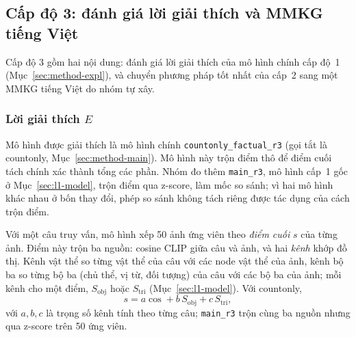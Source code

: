 \subsection{Cấp độ 3: đánh giá lời giải thích và MMKG tiếng Việt}
\label{sec:method-l3}

Cấp độ 3 gồm hai nội dung: đánh giá lời giải thích của mô hình chính cấp độ~1 (Mục~\ref{sec:method-expl}), và chuyển phương pháp
tốt nhất của cấp~2 sang một MMKG tiếng Việt do nhóm tự xây.

\subsubsection{Lời giải thích $E$}\label{sec:xai-setup}
Mô hình được giải thích là mô hình chính \texttt{countonly\_factual\_r3} (gọi tắt là countonly, Mục~\ref{sec:method-main}).
Mô hình này trộn điểm thô để điểm cuối tách chính xác thành tổng các phần. Nhóm đo thêm \texttt{main\_r3}, mô hình
cấp~1 gốc ở Mục~\ref{sec:l1-model}, trộn điểm qua z-score, làm mốc so sánh; vì hai mô hình khác nhau ở bốn thay đổi, phép
so sánh không tách riêng được tác dụng của cách trộn điểm.

Với một câu truy vấn, mô hình xếp 50 ảnh ứng viên theo \emph{điểm cuối} $s$ của từng ảnh. Điểm này trộn ba nguồn:
cosine CLIP giữa câu và ảnh, và hai \emph{kênh} khớp đồ thị. Kênh vật thể so từng vật thể của câu với các node vật thể của
ảnh, kênh bộ ba so từng bộ ba (chủ thể, vị từ, đối tượng) của câu với các bộ ba của ảnh; mỗi kênh cho một điểm,
$S_{\text{obj}}$ hoặc $S_{\text{tri}}$ (Mục~\ref{sec:l1-model}). Với countonly,
\begin{equation}
  s=a\cos+b\,S_{\text{obj}}+c\,S_{\text{tri}},
  \label{eq:xai-fusion}
\end{equation}
với $a,b,c$ là trọng số kênh tính theo từng câu; \texttt{main\_r3} trộn cùng ba nguồn nhưng qua z-score trên 50 ứng viên.

